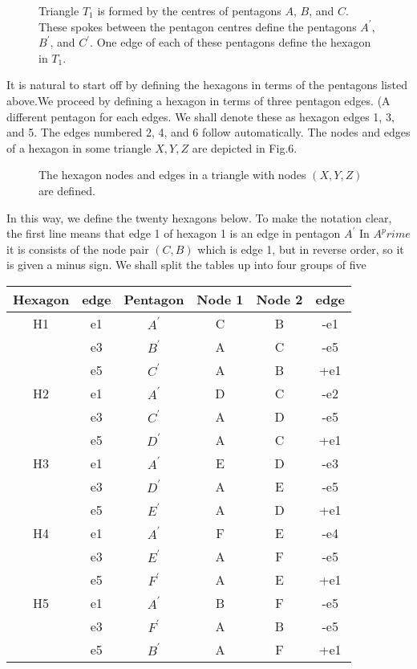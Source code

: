 \documentclass[12pt]{article}
\begin{document}
\vspace*{10cm}
\begin{figure}[htb]
\caption{ 
Triangle $T_1$ is formed by the centres of pentagons $A$, $B$, and $C$. 
These spokes between the pentagon centres define the pentagons $A^\prime$,
 $B^\prime$, and $C^\prime$. One edge of each of these pentagons define the hexagon in
$T_1$.
}
\end{figure}

It is natural to start off by defining the hexagons in terms of the pentagons listed above.We proceed by defining a hexagon in terms of three pentagon edges. (A different pentagon for each edges. We shall denote these as hexagon edges 1, 3, and 5.  The edges
numbered 2, 4, and 6 follow automatically. The nodes and edges of a hexagon in some
triangle $X, Y, Z$ are depicted in Fig.6.
\vspace*{10cm}
\begin{figure}[htb]
\caption{ 
The hexagon nodes and edges in a triangle with nodes $(X,Y,Z)$ are defined.
}
\end{figure}

In this way, we define the twenty hexagons below. To make the notation clear,
the first line means that edge 1 of hexagon 1 is an edge in pentagon $A^\prime$
In $A^prime$ it is consists of the node pair $(C,B)$ which is edge 1, but in
reverse order, so it is given a minus sign. We shall split the tables up into four 
groups of five


\begin{center}
\begin{tabular}{| c | c | c | c | c | c |}
\hline
Hexagon  & edge & Pentagon & Node 1 & Node 2 & edge \\
\hline
H1 &  e1  & $A^\prime$ &  C  & B &  -e1 \\
   &  e3  & $B^\prime$ &  A  & C &  -e5 \\
   &  e5  & $C^\prime$ &  A  & B &  +e1 \\
\hline
H2 &  e1  & $A^\prime$ &  D  & C &  -e2 \\
   &  e3  & $C^\prime$ &  A  & D &  -e5 \\
   &  e5  & $D^\prime$ &  A  & C &  +e1 \\
\hline
H3 &  e1  & $A^\prime$ &  E  & D &  -e3 \\
   &  e3  & $D^\prime$ &  A  & E &  -e5 \\
   &  e5  & $E^\prime$ &  A  & D &  +e1 \\
\hline
H4 &  e1  & $A^\prime$ &  F  & E &  -e4 \\
   &  e3  & $E^\prime$ &  A  & F &  -e5 \\
   &  e5  & $F^\prime$ &  A  & E &  +e1 \\
\hline
H5 &  e1  & $A^\prime$ &  B  & F &  -e5 \\
   &  e3  & $F^\prime$ &  A  & B &  -e5 \\
   &  e5  & $B^\prime$ &  A  & F &  +e1 \\
\hline
\end{tabular}
\end{center}
\end{document}
